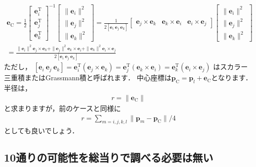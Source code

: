 ﻿\documentclass[a4paper]{jsarticle}
\begin{document}
\begin{align*}
\boldsymbol{e}_{\mathrm{C}}=
\frac{1}{2}
\begin{bmatrix} \boldsymbol{e}_{i}^{\mathrm{T}} \\ \boldsymbol{e}_{j}^{\mathrm{T}} \\ \boldsymbol{e}_{k}^{\mathrm{T}} \end{bmatrix}^{-1}
\begin{bmatrix} \|\boldsymbol{e}_{i}\|^{2} \\ \|\boldsymbol{e}_{j}\|^{2} \\ \|\boldsymbol{e}_{k}\|^{2} \end{bmatrix}
=
\frac{1}{2\left[\boldsymbol{e}_{i}~\boldsymbol{e}_{j}~\boldsymbol{e}_{k}\right]}
\begin{bmatrix}
\boldsymbol{e}_{j}\times\boldsymbol{e}_{k} & \boldsymbol{e}_{k}\times\boldsymbol{e}_{i} & \boldsymbol{e}_{i}\times\boldsymbol{e}_{j}
\end{bmatrix}
\begin{bmatrix} \|\boldsymbol{e}_{i}\|^{2} \\ \|\boldsymbol{e}_{j}\|^{2} \\ \|\boldsymbol{e}_{k}\|^{2} \end{bmatrix}
\\
=
\frac{
\|\boldsymbol{e}_{i}\|^{2}\boldsymbol{e}_{j}\times\boldsymbol{e}_{k}
+\|\boldsymbol{e}_{j}\|^{2}\boldsymbol{e}_{k}\times\boldsymbol{e}_{i}
+\|\boldsymbol{e}_{k}\|^{2}\boldsymbol{e}_{i}\times\boldsymbol{e}_{j}
}
{2\left[\boldsymbol{e}_{i}~\boldsymbol{e}_{j}~\boldsymbol{e}_{k}\right]}
\end{align*}
ただし，
$\left[\boldsymbol{e}_{i}~\boldsymbol{e}_{j}~\boldsymbol{e}_{k}\right]
=\boldsymbol{e}_{i}^{\mathrm{T}}(\boldsymbol{e}_{j}\times\boldsymbol{e}_{k})
=\boldsymbol{e}_{j}^{\mathrm{T}}(\boldsymbol{e}_{k}\times\boldsymbol{e}_{i})
=\boldsymbol{e}_{k}^{\mathrm{T}}(\boldsymbol{e}_{i}\times\boldsymbol{e}_{j})$
はスカラー三重積またはGrassmann積と呼ばれます．
中心座標は$\boldsymbol{p}_{\mathrm{C}}=\boldsymbol{p}_{l}+\boldsymbol{e}_{\mathrm{C}}$となります．
半径は，
\begin{align*}
r=\|\boldsymbol{e}_{\mathrm{C}}\|
\end{align*}
と求まりますが，前のケースと同様に
\begin{align*}
r=\sum_{m=i,j,k,l}\|\boldsymbol{p}_{m}-\boldsymbol{p}_{\mathrm{C}}\|/4
\end{align*}
としても良いでしょう．

\subsection{10通りの可能性を総当りで調べる必要は無い}
\end{document}
